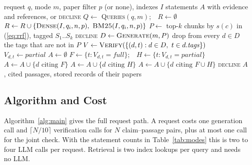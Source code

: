 \documentclass[10pt,twocolumn,letterpaper]{article}
\begin{document}
\begin{algorithm}[t]
\caption{Evidence-grounded answering}
\label{alg:main}
\footnotesize
\begin{algorithmic}[1]
\Require request $q$, mode $m$, paper filter $p$ (or none), indexes $I$
\Ensure statements $A$ with evidence and references, or \textsc{decline}
\State $Q \gets$ \textsc{Queries}$(q,m)$;\ \ $R\gets\emptyset$ 
  \State $R \gets R \cup \{\textsc{Dense}(I,q_i,n,p),\ \textsc{BM25}(I,q_i,n,p)\}$
\EndFor
\State $P \gets$ top-$k$ chunks by $s(c)$ in (\ref{eq:rrf}), tagged $S_1..S_k$
 \Return \textsc{decline} \EndIf
\State $D \gets \textsc{Generate}(m,P)$ 
\State drop from every $d\in D$ the tags that are not in $P$
\State $V \gets \textsc{Verify}(\{(d,t): d\in D,\ t\in d.\mathit{tags}\})$ 
  \State $V_{d,t}\gets\textit{partial}$ 
\EndFor
\State $A\gets\emptyset$
  \State $F\gets\{t: V_{d,t}=\textit{full}\}$;\ \ $H\gets\{t: V_{d,t}=\textit{partial}\}$
     $A\gets A\cup\{d \text{ citing } F\}$
      \State $A\gets A\cup\{d \text{ citing } H\}$
    \EndIf {}
    \State $A\gets A\cup\{d \text{ citing } F\cup H\}$ 
  \EndIf
\EndFor
{} \Return \textsc{decline} \EndIf
\State \Return $A$, cited passages, stored records of their papers
\end{algorithmic}
\end{algorithm}

\subsection{Algorithm and Cost}
Algorithm~\ref{alg:main} gives the full request path. A request costs one generation call and $\lceil N/10\rceil$ verification calls for $N$ claim--passage pairs, plus at most one call for the joint check. With the statement counts in Table~\ref{tab:modes} this is two to four LLM calls per request. Retrieval is two index lookups per query and needs no LLM.
\end{document}
